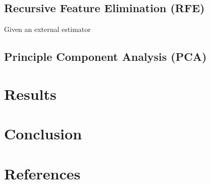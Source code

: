 \documentclass{article}
\begin{document}
\subsection{Recursive Feature Elimination (RFE)}
Given an external estimator


\subsection{Principle Component Analysis (PCA)}


\section{Results}
\section{Conclusion}

\section*{References}
\end{document}
